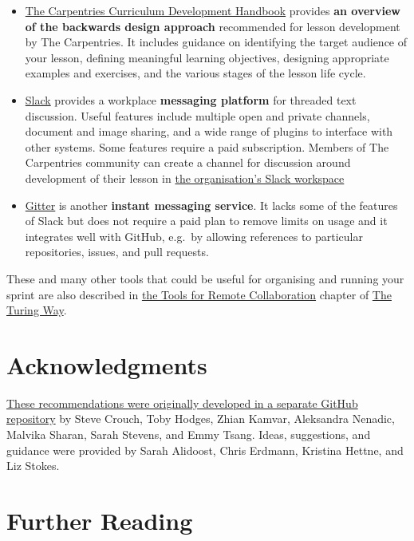 \documentclass[
]{book}
\begin{document}
\begin{itemize}
\item
  \href{https://cdh.carpentries.org/}{The Carpentries Curriculum Development Handbook}
  provides \textbf{an overview of the backwards design approach} recommended for lesson development by The Carpentries.
  It includes guidance on identifying the target audience of your lesson,
  defining meaningful learning objectives,
  designing appropriate examples and exercises,
  and the various stages of the lesson life cycle.
\item
  \href{https://slack.com/}{Slack}
  provides a workplace \textbf{messaging platform} for threaded text discussion.
  Useful features include multiple open and private channels,
  document and image sharing,
  and a wide range of plugins to interface with other systems.
  Some features require a paid subscription.
  Members of The Carpentries community can
  create a channel for discussion around development of their lesson in
  \href{https://swc-slack-invite.herokuapp.com/}{the organisation's Slack workspace}
\item
  \href{https://gitter.im/}{Gitter} is another \textbf{instant messaging service}.
  It lacks some of the features of Slack but does not require a paid plan
  to remove limits on usage and it integrates well with GitHub,
  e.g.~by allowing references to particular repositories, issues, and pull requests.
\end{itemize}

These and many other tools that could be useful for organising and running your sprint are also described in \href{https://the-turing-way.netlify.app/collaboration/remote-collab/remote-collab-tools.html}{the Tools for Remote Collaboration} chapter of \href{https://the-turing-way.netlify.app/}{The Turing Way}.

\hypertarget{acknowledgments}{%
\section{Acknowledgments}\label{acknowledgments}}

\href{https://github.com/tobyhodges/lesson-sprint-recommendations}{These recommendations were originally developed in a separate GitHub repository} by
Steve Crouch,
Toby Hodges,
Zhian Kamvar,
Aleksandra Nenadic,
Malvika Sharan,
Sarah Stevens,
and Emmy Tsang.
Ideas, suggestions, and guidance were provided by
Sarah Alidoost,
Chris Erdmann,
Kristina Hettne,
and Liz Stokes.

\hypertarget{further-reading}{%
\section{Further Reading}\label{further-reading}}
\end{document}
